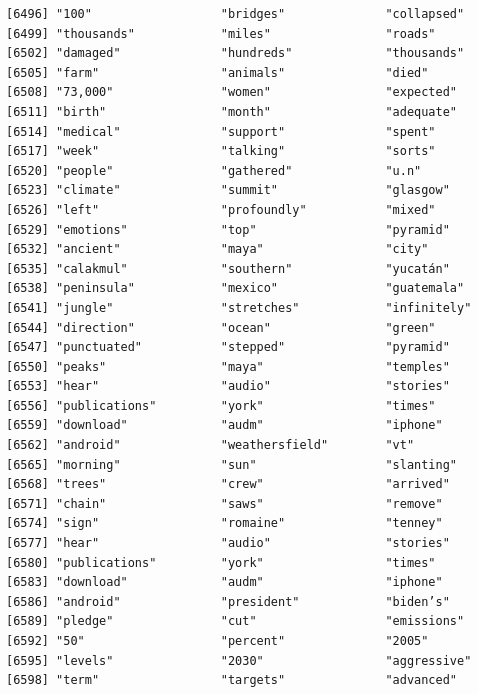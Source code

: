 \documentclass[
  letterpaper,
  DIV=11,
  numbers=noendperiod]{scrartcl}
\begin{document}
\begin{verbatim}
[6496] "100"                  "bridges"              "collapsed"           
[6499] "thousands"            "miles"                "roads"               
[6502] "damaged"              "hundreds"             "thousands"           
[6505] "farm"                 "animals"              "died"                
[6508] "73,000"               "women"                "expected"            
[6511] "birth"                "month"                "adequate"            
[6514] "medical"              "support"              "spent"               
[6517] "week"                 "talking"              "sorts"               
[6520] "people"               "gathered"             "u.n"                 
[6523] "climate"              "summit"               "glasgow"             
[6526] "left"                 "profoundly"           "mixed"               
[6529] "emotions"             "top"                  "pyramid"             
[6532] "ancient"              "maya"                 "city"                
[6535] "calakmul"             "southern"             "yucatán"             
[6538] "peninsula"            "mexico"               "guatemala"           
[6541] "jungle"               "stretches"            "infinitely"          
[6544] "direction"            "ocean"                "green"               
[6547] "punctuated"           "stepped"              "pyramid"             
[6550] "peaks"                "maya"                 "temples"             
[6553] "hear"                 "audio"                "stories"             
[6556] "publications"         "york"                 "times"               
[6559] "download"             "audm"                 "iphone"              
[6562] "android"              "weathersfield"        "vt"                  
[6565] "morning"              "sun"                  "slanting"            
[6568] "trees"                "crew"                 "arrived"             
[6571] "chain"                "saws"                 "remove"              
[6574] "sign"                 "romaine"              "tenney"              
[6577] "hear"                 "audio"                "stories"             
[6580] "publications"         "york"                 "times"               
[6583] "download"             "audm"                 "iphone"              
[6586] "android"              "president"            "biden’s"             
[6589] "pledge"               "cut"                  "emissions"           
[6592] "50"                   "percent"              "2005"                
[6595] "levels"               "2030"                 "aggressive"          
[6598] "term"                 "targets"              "advanced"            

\end{verbatim}
\end{document}
